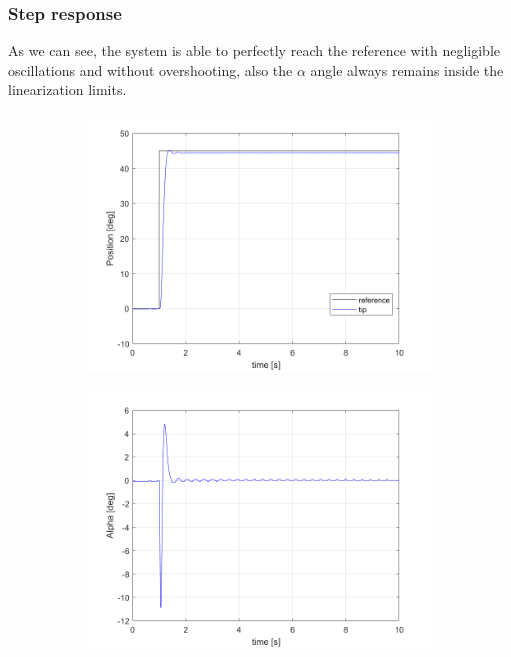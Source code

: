 \subsubsection{Step response}

As we can see, the system is able to perfectly reach the reference with negligible oscillations and without overshooting, also the $\alpha$ angle always remains inside the linearization limits.
\begin{figure}[H]
     \centering
     \begin{subfigure}{0.47\textwidth}
         \centering
         \includegraphics[width=\textwidth]{./images/Chapter 4/PP/ppsteptip.png}    %
     \end{subfigure}
     \hfill
     \begin{subfigure}{0.47\textwidth}
         \centering
         \includegraphics[width=\textwidth]{./images/Chapter 4/PP/ppstepalpha.png}
     \end{subfigure}
\end{figure}
